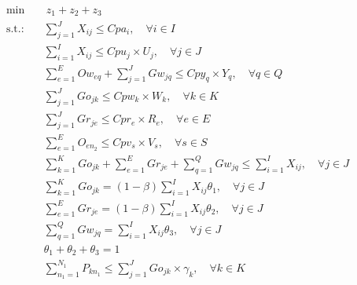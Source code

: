 \documentclass[preprint,12pt,authoryear]{elsarticle}
\begin{document}
\begin{align}
    \min &\ z_1 + z_2 + z_3 \label{eq:custo}\\
    \text{s.t.:} \quad & \sum\limits_{j=1}^J X_{ij} \le Cpa_i, \quad \forall i \in I \label{eq:restricao1}\\
    & \sum\limits_{i=1}^I X_{ij} \le Cpu_j\times U_j, \quad \forall j \in J \label{eq:restricao2}\\
    & \sum\limits_{e=1}^E Ow_{eq} + \sum\limits_{j=1}^J Gw_{jq} \le Cpy_q \times Y_q, \quad \forall q \in Q \label{eq:restricao3} \\
    & \sum\limits_{j=1}^J Go_{jk} \le Cpw_k\times W_k, \quad \forall k \in K \label{eq:restricao4}\\
    & \sum\limits_{j=1}^J Gr_{je} \le Cpr_e\times R_e, \quad \forall e \in E \label{eq:restricao5}\\
    & \sum\limits_{e=1}^E O_{en_2} \le Cpv_s\times V_s, \quad \forall s \in S \label{eq:restricao6}\\
    & \sum\limits_{k=1}^K Go_{jk} + \sum\limits_{e=1}^E Gr_{je} + \sum\limits_{q=1}^Q Gw_{jq} \le \sum\limits_{i=1}^I X_{ij}, \quad \forall j \in J \label{eq:restricao7} \\
    & \sum\limits_{k=1}^K Go_{jk} = (1-\beta) \sum\limits_{i=1}^I X_{ij}\theta_1, \quad \forall j\in J \label{eq:restricao8} \\
    & \sum\limits_{e=1}^E Gr_{je} = (1-\beta) \sum\limits_{i=1}^I X_{ij}\theta_2, \quad \forall j\in J \label{eq:restricao9} \\
    & \sum\limits_{q=1}^Q Gw_{jq} = \sum\limits_{i=1}^I X_{ij}\theta_3, \quad \forall j\in J \label{eq:restricao10} \\
    & \theta_1 + \theta_2 + \theta_3 = 1 \label{eq:restricao11} \\
    & \sum\limits_{n_1=1}^{N_1} P_{kn_1} \le \sum\limits_{j=1}^J Go_{jk} \times \gamma_k, \quad \forall k \in K \label{eq:restricao12}
\end{align}
\end{document}
